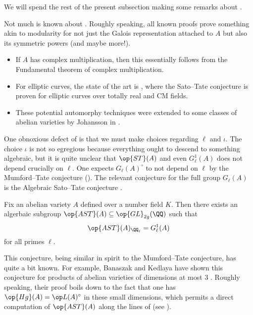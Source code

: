 \documentclass[../thesis.tex]{subfiles}
\begin{document}
We will spend the rest of the present subsection making some remarks about .
\begin{remark}
	Not much is known about . Roughly speaking, all known proofs prove something akin to modularity for not just the Galois representation attached to $A$ but also its symmetric powers (and maybe more!).
	\begin{itemize}
		\item If $A$ has complex multiplication, then this essentially follows from the Fundamental theorem of complex multiplication.
		\item For elliptic curves, the state of the art is \cite{bgtt-potential-automorphy,bgdht-potential-automorphy-2}, where the Sato--Tate conjecture is proven for elliptic curves over totally real and CM fields.
		\item These potential automorphy techniques were extended to some classes of abelian varieties by Johansson in \cite[Theorem~1]{johansson-sato-tate}.
	\end{itemize}
\end{remark}
One obnoxious defect of  is that we must make choices regarding $\ell$ and $\iota$. The choice $\iota$ is not so egregious because everything ought to descend to something algebraic, but it is quite unclear that $\op{ST}(A)$ and even $G_\ell^1(A)$ does not depend crucially on $\ell$. One expects $G_\ell(A)^\circ$ to not depend on $\ell$ by the Mumford--Tate conjecture (). The relevant conjecture for the full group $G_\ell(A)$ is the Algebraic Sato--Tate conjecture \cite[Conjecture~2.1]{bk-algebraic-st}.
\begin{conj} \label{conj:ast}
	Fix an abelian variety $A$ defined over a number field $K$. Then there exists an algerbaic subgroup $\op{AST}(A)\subseteq\op{GL}_{2g}(\QQ)$ such that
	\[\op{AST}(A)_{\QQ_\ell}=G_\ell^1(A)\]
	for all primes $\ell$.
\end{conj}
This conjecture, being similar in spirit to the Mumford--Tate conjecture, has quite a bit known. For example, Banaszak and Kedlaya have shown this conjecture for products of abelian varieties of dimensions at most $3$ \cite[Theorem~6.11]{bk-algebraic-st}. Roughly speaking, their proof boils down to the fact that one has $\op{Hg}(A)=\op L(A)^\circ$ in these small dimensions, which permits a direct computation of $\op{AST}(A)$ along the lines of  (see ).
\end{document}

